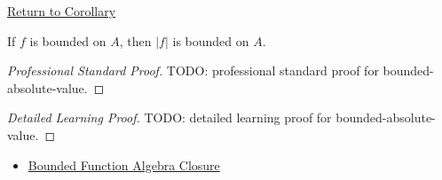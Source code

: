 \newpage
{}
\label{prf:bounded-absolute-value}

\begin{remark*}[Return]
\hyperref[cor:bounded-absolute-value]{Return to Corollary}
\end{remark*}

\begin{corollary*}
If \(f\) is bounded on \(A\), then \(|f|\) is bounded on \(A\).
\end{corollary*}

\begin{proof}[Professional Standard Proof]
\LRAProofBodyStart
TODO: professional standard proof for bounded-absolute-value.
\end{proof}

\begin{proof}[Detailed Learning Proof]
\LRAProofBodyStart
TODO: detailed learning proof for bounded-absolute-value.
\end{proof}

\begin{remark*}
\end{remark*}

\begin{dependencies}
\begin{itemize}
  \item \hyperref[thm:bounded-function-algebra-closure]{Bounded Function Algebra Closure}
\end{itemize}
\end{dependencies}

\clearpage
